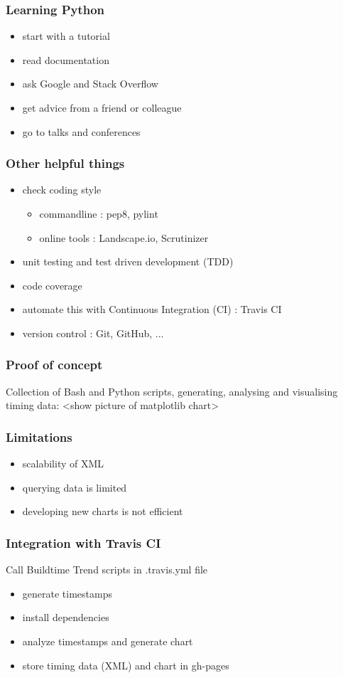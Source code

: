 \documentclass[14pt]{beamer}
\begin{document}
  \begin{frame}
    \frametitle{Learning Python}
    \begin{itemize}
      \item start with a tutorial
      \item read documentation
      \item ask Google and Stack Overflow
      \item get advice from a friend or colleague
      \item go to talks and conferences
    \end{itemize}
  \end{frame}
  \begin{frame}
    \frametitle{Other helpful things}
    \begin{itemize}
      \item check coding style
        \begin{itemize}
          \item commandline : pep8, pylint
          \item online tools : Landscape.io, Scrutinizer
        \end{itemize}
      \item unit testing and test driven development (TDD)
      \item code coverage
      \item automate this with Continuous Integration (CI) : Travis CI
      \item version control : Git, GitHub, ...
    \end{itemize}
  \end{frame}
  \begin{frame}
    \frametitle{Proof of concept}
    Collection of Bash and Python scripts, generating, analysing and visualising timing data:
    <show picture of matplotlib chart>
  \end{frame}
  \begin{frame}
    \frametitle{Limitations}
    \begin{itemize}
      \item scalability of XML
      \item querying data is limited
      \item developing new charts is not efficient
    \end{itemize}
  \end{frame}
  \begin{frame}
    \frametitle{Integration with Travis CI}
    Call Buildtime Trend scripts in .travis.yml file
    \begin{itemize}
      \item generate timestamps
      \item install dependencies
      \item analyze timestamps and generate chart
      \item store timing data (XML) and chart in gh-pages
    \end{itemize}
  \end{frame}
\end{document}
